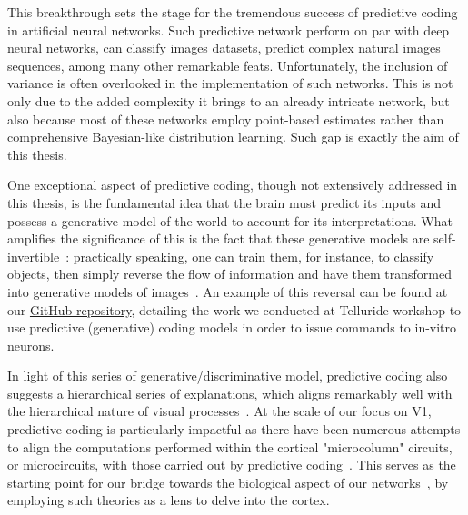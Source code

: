 This breakthrough sets the stage for the tremendous success of predictive coding in artificial neural networks. Such predictive network perform on par with deep neural networks, can classify images datasets, predict complex natural images sequences, among many other remarkable feats. Unfortunately, the inclusion of variance is often overlooked in the implementation of such networks. This is not only due to the added complexity it brings to an already intricate network, but also because most of these networks employ point-based estimates rather than comprehensive Bayesian-like distribution learning. Such gap is exactly the aim of this thesis.

One exceptional aspect of predictive coding, though not extensively addressed in this thesis, is the fundamental idea that the brain must predict its inputs and possess a generative model of the world to account for its interpretations. What amplifies the significance of this is the fact that these generative models are self-invertible~\cite{millidge2021predictive}: practically speaking, one can train them, for instance, to classify objects, then simply reverse the flow of information and have them transformed into generative models of images~\cite{millidge2020relaxing}. An example of this reversal can be found at our \href{https://github.com/neuromorphs/BrainDishSiMulator/blob/main/notebooks/Dishbrain_predictive_coding.ipynb}{GitHub repository}, detailing the work we conducted at Telluride workshop to use predictive (generative) coding models in order to issue commands to in-vitro neurons.

In light of this series of generative/discriminative model, predictive coding also suggests a hierarchical series of explanations, which aligns remarkably well with the hierarchical nature of visual processes~\cite{boutin2021sparse, boutin2022pooling}. At the scale of our focus on \gls{V1}, predictive coding is particularly impactful as there have been numerous attempts to align the computations performed within the cortical "microcolumn" circuits, or microcircuits, with those carried out by predictive coding~\cite{bastos2012canonical}. This serves as the starting point for our bridge towards the biological aspect of our networks~\cite{shipp2016neural}, by employing such theories as a lens to delve into the cortex.

\newpage

